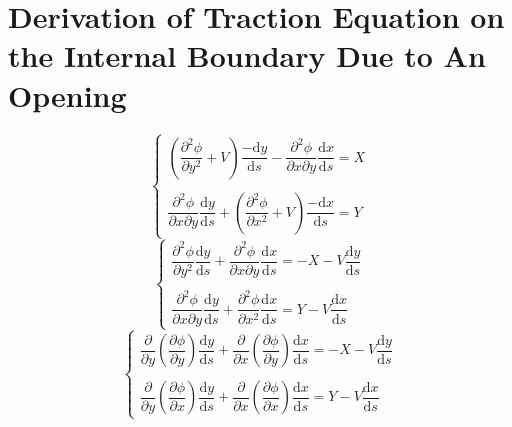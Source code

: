 \section{Derivation of Traction Equation on the Internal Boundary Due to An Opening}\label{app:internal}

\begin{equation*}
\left\{\begin{matrix}
    \left(\dfrac{\partial^2 \phi}{\partial y^2} + V \right) \dfrac{-\mathrm{d}y}{\mathrm{d}s} - \dfrac{\partial^2 \phi}{\partial x \partial y}  \dfrac{\mathrm{d}x}{\mathrm{d}s} = X   \\
    \\
    \dfrac{\partial^2 \phi}{\partial x \partial y}  \dfrac{\mathrm{d}y}{\mathrm{d}s} + \left( \dfrac{\partial^2 \phi}{\partial x^2} + V \right) \dfrac{-\mathrm{d}x}{\mathrm{d}s} = Y  
\end{matrix}\right.
\end{equation*}
\begin{equation*}
\left\{\begin{matrix}
    \dfrac{\partial^2 \phi}{\partial y^2} \dfrac{\mathrm{d}y}{\mathrm{d}s} + \dfrac{\partial^2 \phi}{\partial x \partial y}  \dfrac{\mathrm{d}x}{\mathrm{d}s} = -X - V \dfrac{\mathrm{d}y}{\mathrm{d}s} \\
    \\
    \dfrac{\partial^2 \phi}{\partial x \partial y}  \dfrac{\mathrm{d}y}{\mathrm{d}s} + \dfrac{\partial^2 \phi}{\partial x^2} \dfrac{\mathrm{d}x}{\mathrm{d}s} = Y - V \dfrac{\mathrm{d}x}{\mathrm{d}s}  
\end{matrix}\right.
\end{equation*}
\begin{equation*}
\left\{\begin{matrix}
    \dfrac{\partial}{\partial y}\left( \dfrac{\partial \phi}{\partial y} \right) \dfrac{\mathrm{d}y}{\mathrm{d}s} + \dfrac{\partial}{\partial x}\left( \dfrac{\partial \phi}{\partial y} \right) \dfrac{\mathrm{d}x}{\mathrm{d}s} = -X - V \dfrac{\mathrm{d}y}{\mathrm{d}s}\\
    \\
    \dfrac{\partial}{\partial y}\left( \dfrac{\partial \phi}{\partial x} \right) \dfrac{\mathrm{d}y}{\mathrm{d}s} + \dfrac{\partial}{\partial x}\left( \dfrac{\partial \phi}{\partial x} \right) \dfrac{\mathrm{d}x}{\mathrm{d}s} = Y - V \dfrac{\mathrm{d}x}{\mathrm{d}s}  
\end{matrix}\right.
\end{equation*}

